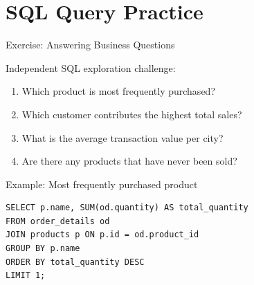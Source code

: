 \documentclass[aspectratio=169, table]{beamer}
\begin{document}
\section{SQL Query Practice}

\begin{frame}[fragile]{Exercise: Answering Business Questions}
\vspace{20pt}

Independent SQL exploration challenge:

\begin{enumerate}
\item Which product is most frequently purchased?
\item Which customer contributes the highest total sales?
\item What is the average transaction value per city?
\item Are there any products that have never been sold?
\end{enumerate}

Example: Most frequently purchased product

\begin{lstlisting}[style=SqlStyle]
SELECT p.name, SUM(od.quantity) AS total_quantity
FROM order_details od
JOIN products p ON p.id = od.product_id
GROUP BY p.name
ORDER BY total_quantity DESC
LIMIT 1;
\end{lstlisting}

\end{frame}
\end{document}
